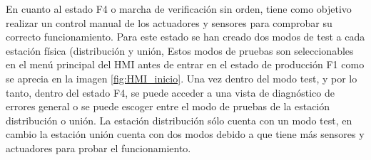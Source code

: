 En cuanto al estado F4 o marcha de verificación sin orden, tiene como objetivo realizar un control manual de los actuadores y sensores para comprobar su correcto funcionamiento. Para este estado se han creado dos modos de test a cada estación física (distribución y unión, Estos modos de pruebas son seleccionables en el menú principal del HMI antes de entrar en el estado de producción F1 como se aprecia en la imagen \ref{fig:HMI_inicio}. Una vez dentro del modo test, y por lo tanto, dentro del estado F4, se puede acceder a una vista de diagnóstico de errores general o  se puede escoger entre el modo de pruebas de la estación distribución o unión. La estación distribución sólo cuenta con un modo test, en cambio la estación unión cuenta con dos modos debido a que tiene más sensores y actuadores para probar el funcionamiento.

